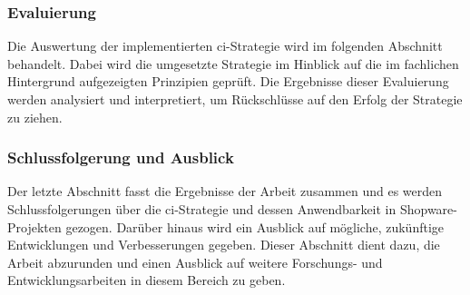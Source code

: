 \subsubsection{Evaluierung}

Die Auswertung der implementierten \acrshort{ci}-Strategie wird im folgenden Abschnitt behandelt.
Dabei wird die umgesetzte Strategie im Hinblick auf die im fachlichen Hintergrund aufgezeigten Prinzipien
geprüft.
Die Ergebnisse dieser Evaluierung werden analysiert und interpretiert, um Rückschlüsse auf den Erfolg der
Strategie zu ziehen.

\subsubsection{Schlussfolgerung und Ausblick}

Der letzte Abschnitt fasst die Ergebnisse der Arbeit zusammen und es werden Schlussfolgerungen über die
\acrshort{ci}-Strategie und dessen Anwendbarkeit in Shopware-Projekten gezogen.
Darüber hinaus wird ein Ausblick auf mögliche, zukünftige Entwicklungen und Verbesserungen gegeben.
Dieser Abschnitt dient dazu, die Arbeit abzurunden und einen Ausblick auf weitere Forschungs- und
Entwicklungsarbeiten in diesem Bereich zu geben.

\clearpage
